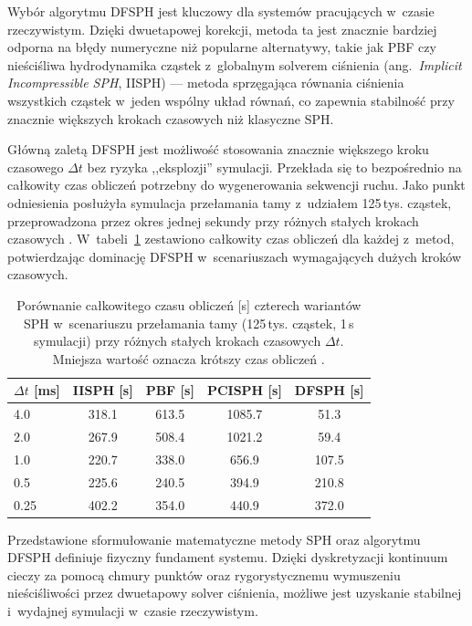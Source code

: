 Wybór algorytmu DFSPH jest kluczowy dla systemów pracujących w~czasie rzeczywistym. 
Dzięki dwuetapowej korekcji, metoda ta jest znacznie bardziej odporna na błędy numeryczne niż popularne alternatywy, 
takie jak PBF czy nieściśliwa hydrodynamika cząstek z~globalnym solverem ciśnienia
(ang.~\textit{Implicit Incompressible SPH}, IISPH) --- metoda sprzęgająca równania
ciśnienia wszystkich cząstek w~jeden wspólny układ równań, co zapewnia stabilność
przy znacznie większych krokach czasowych niż klasyczne SPH.

Główną zaletą DFSPH jest możliwość stosowania znacznie większego kroku czasowego $\Delta t$ bez ryzyka ,,eksplozji'' symulacji. 
Przekłada się to bezpośrednio na całkowity czas obliczeń potrzebny do wygenerowania sekwencji ruchu. 
Jako punkt odniesienia posłużyła symulacja przełamania tamy z~udziałem 125\,tys. cząstek, 
przeprowadzona przez okres jednej sekundy przy różnych stałych krokach czasowych \cite{bender2015divergence}. 
W~tabeli~\ref{tab:performance_comparison} zestawiono całkowity czas obliczeń dla każdej z~metod, 
potwierdzając dominację DFSPH w~scenariuszach wymagających dużych kroków czasowych.

\begin{table}[ht]
    \centering
    \caption{Porównanie całkowitego czasu obliczeń [s] czterech wariantów SPH
    w~scenariuszu przełamania tamy (125\,tys. cząstek, 1\,s symulacji)
    przy różnych stałych krokach czasowych $\Delta t$.
    Mniejsza wartość oznacza krótszy czas obliczeń \cite{bender2015divergence}.}
    \label{tab:performance_comparison}
    \small
    \begin{tabular}{lcccc}
    \toprule
    $\Delta t$ [ms] & IISPH [s] & PBF [s] & PCISPH [s] & \textbf{DFSPH [s]} \\ \midrule
    4.0             & 318.1     & 613.5   & 1085.7     & 51.3                \\
    2.0             & 267.9     & 508.4   & 1021.2     & 59.4                 \\
    1.0             & 220.7     & 338.0   & 656.9      & 107.5                 \\
    0.5             & 225.6     & 240.5   & 394.9      & 210.8                  \\
    0.25            & 402.2     & 354.0   & 440.9      & 372.0                   \\ \bottomrule
    \end{tabular}
\end{table}

Przedstawione sformułowanie matematyczne metody SPH oraz algorytmu DFSPH definiuje fizyczny fundament systemu. Dzięki dyskretyzacji kontinuum cieczy za pomocą chmury punktów oraz rygorystycznemu wymuszeniu nieściśliwości przez dwuetapowy solver ciśnienia, możliwe jest uzyskanie stabilnej i~wydajnej symulacji w~czasie rzeczywistym.

